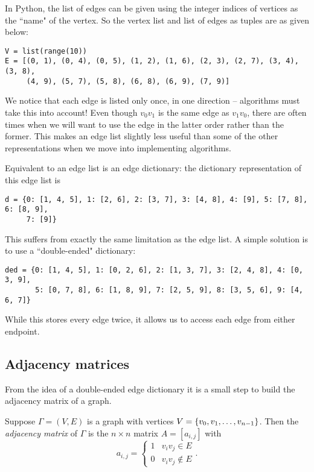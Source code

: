 \documentclass[m3380-lec-main.tex]{subfiles}
\begin{document}
In Python, the list of edges can be given using the integer indices of vertices as the ``name" of the vertex. So the vertex list and list of edges as tuples are as given below:

\bc
\begin{verbatim}
V = list(range(10))
E = [(0, 1), (0, 4), (0, 5), (1, 2), (1, 6), (2, 3), (2, 7), (3, 4), (3, 8), 
     (4, 9), (5, 7), (5, 8), (6, 8), (6, 9), (7, 9)]
\end{verbatim}
\ec

We notice that each edge is listed only once, in one direction -- algorithms must take this into account! Even though $v_0v_1$ is the same edge as $v_1v_0$, there are often times when we will want to use the edge in the latter order rather than the former. This makes an edge list slightly less useful than some of the other representations when we move into implementing algorithms.

Equivalent to an edge list is an edge dictionary: the dictionary representation of this edge list is 

\bc
\begin{verbatim}
d = {0: [1, 4, 5], 1: [2, 6], 2: [3, 7], 3: [4, 8], 4: [9], 5: [7, 8], 6: [8, 9],
     7: [9]}
\end{verbatim}
\ec
This suffers from exactly the same limitation as the edge list. A simple solution is to use a ``double-ended" dictionary:

\bc
\begin{verbatim}
ded = {0: [1, 4, 5], 1: [0, 2, 6], 2: [1, 3, 7], 3: [2, 4, 8], 4: [0, 3, 9],
       5: [0, 7, 8], 6: [1, 8, 9], 7: [2, 5, 9], 8: [3, 5, 6], 9: [4, 6, 7]}
\end{verbatim}
\ec
While this stores every edge twice, it allows us to access each edge from either endpoint.

\subsection{Adjacency matrices}
From the idea of a double-ended edge dictionary it is a small step to build the adjacency matrix of a graph. 

\begin{defn} Suppose $\Gamma=(V,E)$ is a graph with vertices $V=\left\{v_0,v_1,\ldots, v_{n-1}\right\}$. Then the \emph{adjacency matrix} of $\Gamma$ is the $n\times n$ matrix $A=[a_{i,j}]$ with
\[a_{i,j} = \begin{cases}1 & v_iv_j\in E \\ 0 & v_iv_j\notin E \end{cases}.\]
\end{defn}
\end{document}
